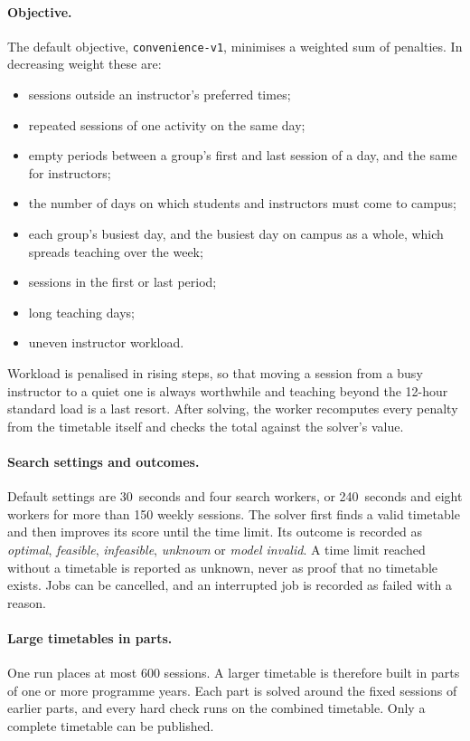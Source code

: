 \paragraph{Objective.} The default objective, \texttt{convenience-v1}, minimises a weighted sum of penalties. In decreasing weight these are:
\begin{itemize}
\item sessions outside an instructor's preferred times;
\item repeated sessions of one activity on the same day;
\item empty periods between a group's first and last session of a day, and the same for instructors;
\item the number of days on which students and instructors must come to campus;
\item each group's busiest day, and the busiest day on campus as a whole, which spreads teaching over the week;
\item sessions in the first or last period;
\item long teaching days;
\item uneven instructor workload.
\end{itemize}
Workload is penalised in rising steps, so that moving a session from a busy instructor to a quiet one is always worthwhile and teaching beyond the 12-hour standard load is a last resort. After solving, the worker recomputes every penalty from the timetable itself and checks the total against the solver's value.

\paragraph{Search settings and outcomes.} Default settings are 30~seconds and four search workers, or 240~seconds and eight workers for more than 150 weekly sessions. The solver first finds a valid timetable and then improves its score until the time limit. Its outcome is recorded as \emph{optimal}, \emph{feasible}, \emph{infeasible}, \emph{unknown} or \emph{model invalid}. A time limit reached without a timetable is reported as unknown, never as proof that no timetable exists. Jobs can be cancelled, and an interrupted job is recorded as failed with a reason.

\paragraph{Large timetables in parts.} One run places at most 600 sessions. A larger timetable is therefore built in parts of one or more programme years. Each part is solved around the fixed sessions of earlier parts, and every hard check runs on the combined timetable. Only a complete timetable can be published.

